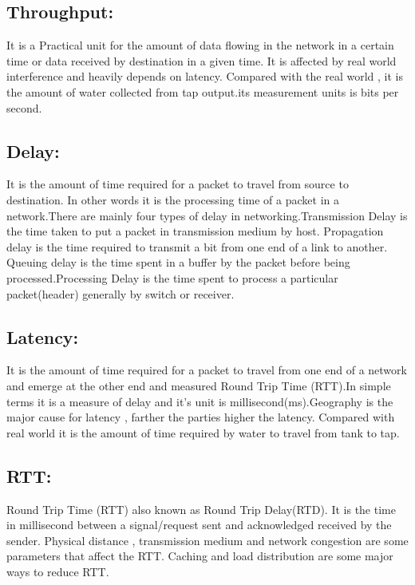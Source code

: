 \documentclass[a4paper,12pt]{article}
\begin{document}
\subsection{Throughput:}
\begin{A}{
It is a Practical unit for the amount of data  flowing in the network in a certain time or  data received by destination in a given time. It is affected by real world interference and heavily depends on latency. Compared with the real world , it is the amount of water collected from tap output.its measurement units is bits per second.}

\end{A}

\subsection{Delay:}
\begin{A}
{It is the amount of time required for a packet 
to travel from source to destination. In other words it is the processing time of a packet in a network.There are mainly four types of delay in networking.Transmission Delay is the time taken to put a packet in transmission medium by host. Propagation delay  is the time required to transmit a bit from one end of a link to another. Queuing delay is the time spent in a buffer by the packet before being processed.Processing Delay is the time spent to process a particular packet(header) generally by switch or receiver.}

\end{A}

\subsection{Latency:}
\begin{A}
{It is the amount of time required for a packet to travel from one end of a network and emerge at the other end and measured Round Trip Time (RTT).In simple terms it is a measure of delay and it's unit is millisecond(ms).Geography is the major cause for latency , farther the parties higher the latency. Compared with real world it is the amount of time required by water to travel from tank to tap.}

\end{A}

\subsection{RTT:}
\begin{A}
{
Round Trip Time (RTT) also known as Round Trip Delay(RTD). It  is the time in millisecond between  a signal/request   sent and  acknowledged received by the sender. Physical distance , transmission medium and network congestion are some parameters that affect the RTT. Caching and load distribution are some major ways to reduce RTT.}
\end{A}
\end{document}
